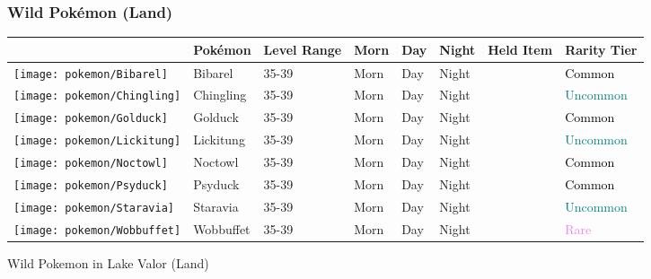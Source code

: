 \subsubsection{Wild Pokémon (Land)}%
\label{ssubsec:WildPokmon(Land)}%
\begin{longtable}{||l l l l l l l l||}%
\hline%
&Pokémon&Level Range&Morn&Day&Night&Held Item&Rarity Tier\\%
\hline%
\endhead%
\hline%
\texttt{[image: pokemon/Bibarel]}&Bibarel&35{-}39&Morn&Day&Night&&\textcolor{black}{%
Common%
}\\%
\hline%
\texttt{[image: pokemon/Chingling]}&Chingling&35{-}39&Morn&Day&Night&&\textcolor{teal}{%
Uncommon%
}\\%
\hline%
\texttt{[image: pokemon/Golduck]}&Golduck&35{-}39&Morn&Day&Night&&\textcolor{black}{%
Common%
}\\%
\hline%
\texttt{[image: pokemon/Lickitung]}&Lickitung&35{-}39&Morn&Day&Night&&\textcolor{teal}{%
Uncommon%
}\\%
\hline%
\texttt{[image: pokemon/Noctowl]}&Noctowl&35{-}39&Morn&Day&Night&&\textcolor{black}{%
Common%
}\\%
\hline%
\texttt{[image: pokemon/Psyduck]}&Psyduck&35{-}39&Morn&Day&Night&&\textcolor{black}{%
Common%
}\\%
\hline%
\texttt{[image: pokemon/Staravia]}&Staravia&35{-}39&Morn&Day&Night&&\textcolor{teal}{%
Uncommon%
}\\%
\hline%
\texttt{[image: pokemon/Wobbuffet]}&Wobbuffet&35{-}39&Morn&Day&Night&&\textcolor{violet}{%
Rare%
}\\%
\hline%
\end{longtable}%
\caption{Wild Pokemon in Lake Valor (Land)}